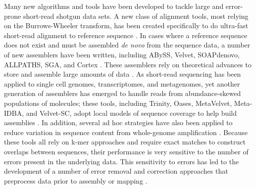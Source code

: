 Many new algorithms and tools have been developed to tackle large and
error-prone short-read shotgun data sets. A new class of alignment
tools, most relying on the Burrows-Wheeler transform, has been created
specifically to do ultra-fast short-read alignment to reference
sequence \cite{pubmed19430453}.  In cases where a reference sequence
does not exist and must be assembled {\em de novo} from the sequence
data, a number of new assemblers have been written, including ABySS,
Velvet, SOAPdenovo, ALLPATHS, SGA, and Cortex
\cite{pubmed19251739,pubmed18349386,pubmed20511140,pubmed21187386,pubmed22156294,cortex}.
These assemblers rely on theoretical advances to store and assemble
large amounts of data \cite{pubmed22068540,pubmed20529929}.  As
short-read sequencing has been applied to single cell genomes,
transcriptomes, and metagenomes, yet another generation of assemblers
has emerged to handle reads from abundance-skewed populations of
molecules; these tools, including Trinity, Oases, MetaVelvet,
Meta-IDBA, and Velvet-SC, adopt local models of sequence coverage to
help build assemblies
\cite{pubmed21572440,pubmed22368243,metavelvet,pubmed21685107,pubmed21926975}.
In addition, several ad hoc strategies have also been applied to reduce
variation in sequence content from whole-genome amplification
\cite{pubmed19724646,pubmed22028825}.
Because these tools all rely on k-mer approaches and require exact
matches to construct overlaps between sequences, their performance is
very sensitive to the number of errors present in the underlying data.
This sensitivity to errors has led to the development of a number of
error removal and correction approaches that preprocess data prior to
assembly or mapping
\cite{pubmed21685062,pubmed15059830,pubmed21114842}.


